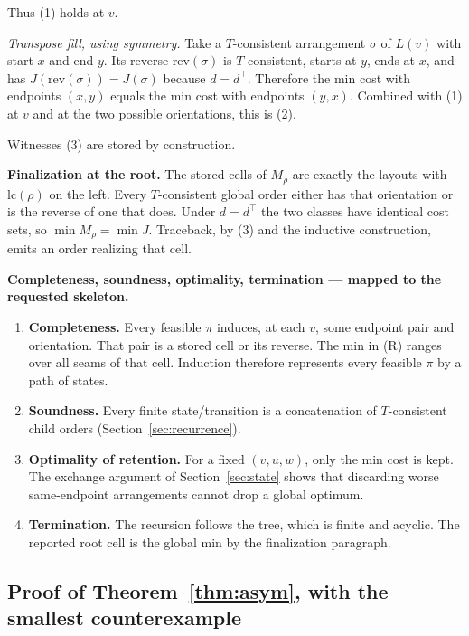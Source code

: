 \documentclass[11pt]{article}
\theoremstyle{plain}
\newcommand{\lc}{\mathrm{lc}}
\newcommand{\rev}{\mathrm{rev}}
\begin{document}
Thus (1) holds at \(v\).

\emph{Transpose fill, using symmetry.} Take a \(T\)-consistent arrangement
\(\sigma\) of \(L(v)\) with start \(x\) and end \(y\). Its reverse
\(\rev(\sigma)\) is \(T\)-consistent, starts at \(y\), ends at \(x\), and has
\(J(\rev(\sigma)) = J(\sigma)\) because \(d = d^\top\). Therefore the min cost
with endpoints \((x,y)\) equals the min cost with endpoints \((y,x)\).
Combined with (1) at \(v\) and at the two possible orientations, this is (2).

Witnesses (3) are stored by construction.

\textbf{Finalization at the root.} The stored cells of \(M_\rho\) are exactly
the layouts with \(\lc(\rho)\) on the left. Every \(T\)-consistent global order
either has that orientation or is the reverse of one that does. Under
\(d = d^\top\) the two classes have identical cost sets, so
\(\min M_\rho = \min J\). Traceback, by (3) and the inductive construction,
emits an order realizing that cell.

\textbf{Completeness, soundness, optimality, termination --- mapped to the
requested skeleton.}

\begin{enumerate}[label=\arabic*.]
\item \textbf{Completeness.} Every feasible \(\pi\) induces, at each \(v\),
  some endpoint pair and orientation. That pair is a stored cell or its
  reverse. The min in (R) ranges over all seams of that cell. Induction
  therefore represents every feasible \(\pi\) by a path of states.
\item \textbf{Soundness.} Every finite state/transition is a concatenation of
  \(T\)-consistent child orders (Section~\ref{sec:recurrence}).
\item \textbf{Optimality of retention.} For a fixed \((v,u,w)\), only the min
  cost is kept. The exchange argument of Section~\ref{sec:state} shows that
  discarding worse same-endpoint arrangements cannot drop a global optimum.
\item \textbf{Termination.} The recursion follows the tree, which is finite
  and acyclic. The reported root cell is the global min by the finalization
  paragraph.
\end{enumerate}

\subsection{Proof of Theorem~\ref{thm:asym}, with the smallest counterexample}
\end{document}
